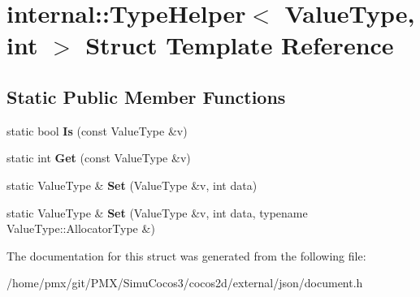 \hypertarget{structinternal_1_1TypeHelper_3_01ValueType_00_01int_01_4}{}\section{internal\+:\+:Type\+Helper$<$ Value\+Type, int $>$ Struct Template Reference}
\label{structinternal_1_1TypeHelper_3_01ValueType_00_01int_01_4}
\subsection*{Static Public Member Functions}
\begin{DoxyCompactItemize}
\item 
\mbox{\label{structinternal_1_1TypeHelper_3_01ValueType_00_01int_01_4_aa17ef940501aac12fd7934ef979c607e}} 
static bool {\bfseries Is} (const Value\+Type \&v)
\item 
\mbox{\label{structinternal_1_1TypeHelper_3_01ValueType_00_01int_01_4_a98c331ac026873b9ad4ba68e7bf28446}} 
static int {\bfseries Get} (const Value\+Type \&v)
\item 
\mbox{\label{structinternal_1_1TypeHelper_3_01ValueType_00_01int_01_4_aceea0a0fac6684e53a9d9f66da4154cd}} 
static Value\+Type \& {\bfseries Set} (Value\+Type \&v, int data)
\item 
\mbox{\label{structinternal_1_1TypeHelper_3_01ValueType_00_01int_01_4_a2ca21bedcaeaf0fffe913edb2fe1a66a}} 
static Value\+Type \& {\bfseries Set} (Value\+Type \&v, int data, typename Value\+Type\+::\+Allocator\+Type \&)
\end{DoxyCompactItemize}


The documentation for this struct was generated from the following file\+:\begin{DoxyCompactItemize}
\item 
/home/pmx/git/\+P\+M\+X/\+Simu\+Cocos3/cocos2d/external/json/document.\+h\end{DoxyCompactItemize}
